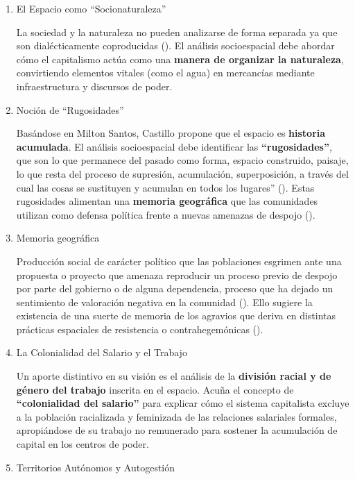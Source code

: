 \documentclass[
  letterpaper,
  DIV=11,
  numbers=noendperiod]{scrreprt}
\begin{document}
\begin{enumerate}
\def\labelenumi{\arabic{enumi}.}
\item
  El Espacio como ``Socionaturaleza''

  La sociedad y la naturaleza no pueden analizarse de forma separada ya
  que son dialécticamente coproducidas (). El análisis socioespacial debe abordar cómo el capitalismo
  actúa como una \textbf{manera de organizar la naturaleza},
  convirtiendo elementos vitales (como el agua) en mercancías mediante
  infraestructura y discursos de poder.
\item
  Noción de ``Rugosidades''

  Basándose en Milton Santos, Castillo propone que el espacio es
  \textbf{historia acumulada}. El análisis socioespacial debe
  identificar las \textbf{``rugosidades''}, que son lo que permanece del
  pasado como forma, espacio construido, paisaje, lo que resta del
  proceso de supresión, acumulación, superposición, a través del cual
  las cosas se sustituyen y acumulan en todos los lugares''
  (). Estas rugosidades alimentan
  una \textbf{memoria geográfica} que las comunidades utilizan como
  defensa política frente a nuevas amenazas de despojo
  ().
\item
  Memoria geográfica

  Producción social de carácter político que las poblaciones esgrimen
  ante una propuesta o proyecto que amenaza reproducir un proceso previo
  de despojo por parte del gobierno o de alguna dependencia, proceso que
  ha dejado un sentimiento de valoración negativa en la comunidad
  (). Ello
  sugiere la existencia de una suerte de memoria de los agravios que
  deriva en distintas prácticas espaciales de resistencia o
  contrahegemónicas ().
\item
  La Colonialidad del Salario y el Trabajo

  Un aporte distintivo en su visión es el análisis de la
  \textbf{división racial y de género del trabajo} inscrita en el
  espacio. Acuña el concepto de \textbf{``colonialidad del salario''}
  para explicar cómo el sistema capitalista excluye a la población
  racializada y feminizada de las relaciones salariales formales,
  apropiándose de su trabajo no remunerado para sostener la acumulación
  de capital en los centros de poder.
\item
  Territorios Autónomos y Autogestión
\end{enumerate}
\end{document}
